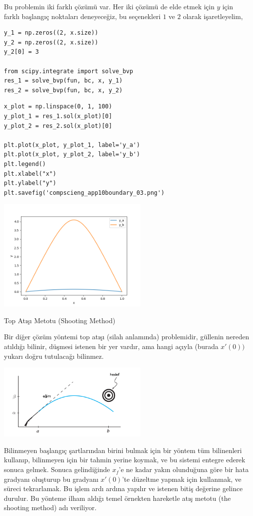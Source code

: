 \documentclass[12pt,fleqn]{article}\usepackage{../../common}
\begin{document}
Bu problemin iki farklı çözümü var. Her iki çözümü de elde etmek için
$y$ için farklı başlangıç noktaları deneyeceğiz, bu seçenekleri $1$ ve
$2$ olarak işaretleyelim,

\begin{verbatim}
y_1 = np.zeros((2, x.size))
y_2 = np.zeros((2, x.size))
y_2[0] = 3

from scipy.integrate import solve_bvp
res_1 = solve_bvp(fun, bc, x, y_1)
res_2 = solve_bvp(fun, bc, x, y_2)
\end{verbatim}

\begin{verbatim}
x_plot = np.linspace(0, 1, 100)
y_plot_1 = res_1.sol(x_plot)[0]
y_plot_2 = res_2.sol(x_plot)[0]

plt.plot(x_plot, y_plot_1, label='y_a')
plt.plot(x_plot, y_plot_2, label='y_b')
plt.legend()
plt.xlabel("x")
plt.ylabel("y")
plt.savefig('compscieng_app10boundary_03.png')
\end{verbatim}


\includegraphics[width=20em]{compscieng_app10boundary_03.png}


Top Atışı Metotu (Shooting Method)

Bir diğer çözüm yöntemi top atışı (silah anlamında) problemidir, güllenin
nereden atıldığı bilinir, düşmesi istenen bir yer vardır, ama hangi açıyla
(burada $x'(0))$ yukarı doğru tutulacağı bilinmez.

\includegraphics[width=20em]{compscieng_app10boundary_02.png}

Bilinmeyen başlangıç şartlarından birini bulmak için bir yöntem tüm
bilinenleri kullanıp, bilinmeyen için bir tahmin yerine koymak, ve bu
sistemi entegre ederek sonuca gelmek. Sonuca gelindiğinde $x_f$'e ne kadar
yakın olunduğuna göre bir hata gradyanı oluşturup bu gradyanı $x'(0)$'te
düzeltme yapmak için kullanmak, ve süreci tekrarlamak. Bu işlem ardı ardına
yapılır ve istenen bitiş değerine gelince durulur. Bu yönteme ilham aldığı
temel örnekten hareketle atış metotu (the shooting method) adı veriliyor.
\end{document}
